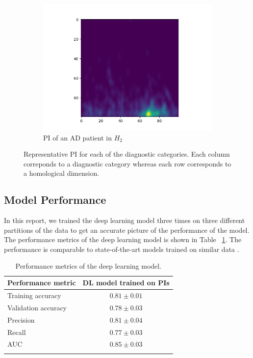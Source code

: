 \documentclass{article}
\begin{document}
\begin{figure}
\begin{subfigure}{0.32\textwidth}
    \includegraphics[width=\textwidth]{figures/PIs/Persistence_image_AD_h_2.png}
    \caption{PI of an AD patient in $H_2$}
  \end{subfigure}
  \caption{Representative PI for each of the diagnostic categories. Each column correponds to a diagnostic category whereas each row corresponds to a homological dimension.}
  \label{fig:sample_rep_pi}
\end{figure}

\subsection{Model Performance}

In this report, we trained the deep learning model three times on three different partitions of the data to get an accurate picture of the performance of the model. The performance metrics of the deep learning model is shown in Table ~\ref{tab:performance}. The performance is comparable to state-of-the-art models trained on similar data \citep{wen2020convolutional}.

\begin{table}
  \centering
  \begin{tabular}{lc}
    \toprule
    \textbf{Performance metric} & \textbf{DL model trained on PIs}\\
    \midrule
    Training accuracy & $0.81\pm 0.01$  \\
    Validation accuracy & $0.78\pm 0.03$  \\
    Precision & $0.81\pm 0.04$  \\
    Recall & $0.77\pm 0.03$  \\
    AUC & $0.85\pm 0.03$  \\
    \bottomrule
    \vspace{1pt}
  \end{tabular}
  \caption{Performance metrics of the deep learning model.}
  \label{tab:performance}
\end{table}
\end{document}
